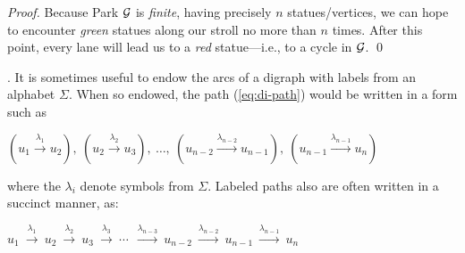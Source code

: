 \begin{proof}
\smallskip

Because Park $\mbox{$\cal G$}$ is {\em finite}, having precisely $n$ statues/vertices, we can hope to encounter {\em green} statues along our stroll no more than $n$ times.  After this point, every lane will lead us to a {\em red} statue---i.e., to a cycle in $\mbox{$\cal G$}$.  \qed
\end{proof}

\bigskip


.
It is sometimes useful to endow the arcs of a digraph with labels from an alphabet $\Sigma$.  When so endowed, the path (\ref{eq:di-path}) would be written in a form such as

\smallskip

\hspace*{.35in}$\displaystyle
(u_1 \stackrel{\lambda_1}{\rightarrow} u_2), \ 
(u_2 \stackrel{\lambda_2}{\rightarrow} u_3), \ \ldots, \ 
(u_{n-2} \stackrel{\lambda_{n-2}}{\rightarrow} u_{n-1}), \ 
(u_{n-1} \stackrel{\lambda_{n-1}}{\rightarrow} u_n)$

\smallskip

\noindent
where the $\lambda_i$ denote symbols from $\Sigma$.  Labeled paths also are often written in a succinct manner, as:

\smallskip

\hspace*{.35in}$\displaystyle 
u_1 \ \stackrel{\lambda_1}{\rightarrow} \ u_2
    \ \stackrel{\lambda_2}{\rightarrow} \ u_3
    \ \stackrel{\lambda_3}{\rightarrow} \ \cdots \ 
    \ \stackrel{\lambda_{n-3}}{\rightarrow} \ u_{n-2}
    \ \stackrel{\lambda_{n-2}}{\rightarrow} \ u_{n-1}
    \  \stackrel{\lambda_{n-1}}{\rightarrow} \ u_n$

\bigskip


